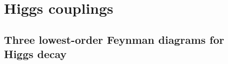 \section{Higgs couplings}
\label{HiggsCouplings} %



\subsection{Three lowest-order Feynman diagrams for Higgs decay} 


\vspace{7mm}

